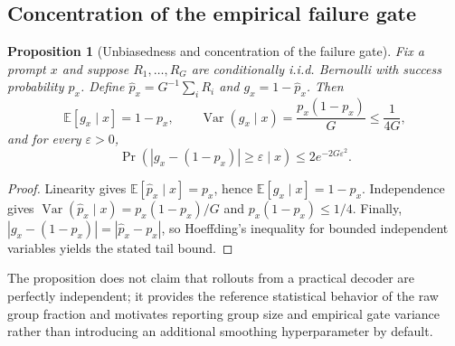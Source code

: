 \documentclass{article}
\newcommand{\E}{\mathbb{E}}
\newtheorem{proposition}{Proposition}
\begin{document}
\subsection{Concentration of the empirical failure gate}
\begin{proposition}[Unbiasedness and concentration of the failure gate]
\label{prop:gate_concentration}
Fix a prompt $x$ and suppose $R_1,\ldots,R_G$ are conditionally i.i.d. Bernoulli with success probability $p_x$. Define $\widehat p_x=G^{-1}\sum_iR_i$ and $g_x=1-\widehat p_x$. Then
\begin{equation}
\E[g_x\mid x]=1-p_x,\qquad
\operatorname{Var}(g_x\mid x)=\frac{p_x(1-p_x)}{G}\le\frac{1}{4G},
\end{equation}
and for every $\varepsilon>0$,
\begin{equation}
\Pr\!\left(\left|g_x-(1-p_x)\right|\ge\varepsilon\mid x\right)
\le 2e^{-2G\varepsilon^2}.
\end{equation}
\end{proposition}
\begin{proof}
Linearity gives $\E[\widehat p_x\mid x]=p_x$, hence $\E[g_x\mid x]=1-p_x$. Independence gives $\operatorname{Var}(\widehat p_x\mid x)=p_x(1-p_x)/G$ and $p_x(1-p_x)\le1/4$. Finally, $|g_x-(1-p_x)|=|\widehat p_x-p_x|$, so Hoeffding's inequality for bounded independent variables yields the stated tail bound.
\end{proof}
The proposition does not claim that rollouts from a practical decoder are perfectly independent; it provides the reference statistical behavior of the raw group fraction and motivates reporting group size and empirical gate variance rather than introducing an additional smoothing hyperparameter by default.
\end{document}
